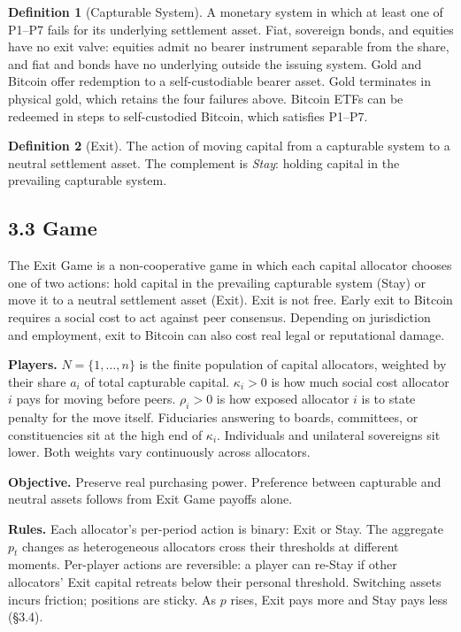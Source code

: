 \documentclass[12pt]{article}
\theoremstyle{definition}
\newtheorem{definition}{Definition}
\theoremstyle{remark}
\begin{document}
\begin{definition}[Capturable System]
A monetary system in which at least one of P1--P7 fails for its
underlying settlement asset. Fiat, sovereign bonds, and equities
have no exit valve: equities admit no bearer instrument separable
from the share, and fiat and bonds have no underlying outside the
issuing system. Gold and Bitcoin offer redemption to a
self-custodiable bearer asset. Gold terminates in physical gold,
which retains the four failures above. Bitcoin ETFs can be
redeemed in steps to self-custodied Bitcoin, which satisfies P1--P7.
\end{definition}

\begin{definition}[Exit]
The action of moving capital from a capturable system to a neutral
settlement asset. The complement is \emph{Stay}: holding
capital in the prevailing capturable system.
\end{definition}

\subsection{3.3 Game}

The Exit Game is a non-cooperative game in which each capital allocator chooses one of two actions: hold capital in the prevailing capturable system (Stay) or move it to a neutral settlement asset (Exit). Exit is not free. Early exit to Bitcoin requires a social cost to act against peer consensus. Depending on jurisdiction and employment, exit to Bitcoin can also cost real legal or reputational damage.

\smallskip
\noindent\textbf{Players.} $N=\{1,\ldots,n\}$ is the finite population of capital allocators, weighted by their share $a_i$ of total capturable capital. $\kappa_i > 0$ is how much social cost allocator $i$ pays for moving before peers. $\rho_i > 0$ is how exposed allocator $i$ is to state penalty for the move itself. Fiduciaries answering to boards, committees, or constituencies sit at the high end of $\kappa_i$. Individuals and unilateral sovereigns sit lower. Both weights vary continuously across allocators.

\smallskip
\noindent\textbf{Objective.} Preserve real purchasing power. Preference between capturable and neutral assets follows from Exit Game payoffs alone.

\smallskip
\noindent\textbf{Rules.} Each allocator's per-period action is binary: Exit or Stay. The aggregate $p_t$ changes as heterogeneous allocators cross their thresholds at different moments. Per-player actions are reversible: a player can re-Stay if other allocators' Exit capital retreats below their personal threshold. Switching assets incurs friction; positions are sticky. As $p$ rises, Exit pays more and Stay pays less (\S3.4).
\end{document}
